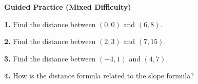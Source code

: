 \documentclass[12pt, letterpaper, fleqn]{article}
\begin{document}
\begin{tcolorbox}[colback=yellow!15, colframe=orange, boxrule=1.5pt, arc=4mm, left=6mm, right=6mm, top=5mm, bottom=5mm]
\textbf{Guided Practice (Mixed Difficulty)}

\medskip
\textbf{1.} Find the distance between $(0, 0)$ and $(6, 8)$. \vspace{1cm}

\textbf{2.} Find the distance between $(2, 3)$ and $(7, 15)$. \vspace{1cm}

\textbf{3.} Find the distance between $(-4, 1)$ and $(4, 7)$. \vspace{1cm}

\textbf{4.} How is the distance formula related to the slope formula? \vspace{1.5cm}
\end{tcolorbox}
\end{document}
